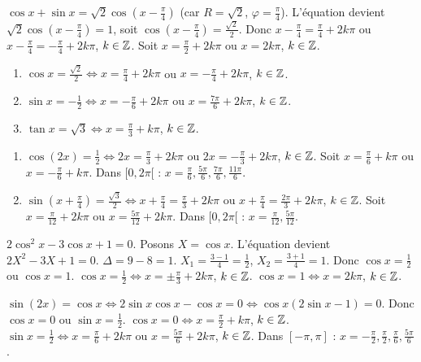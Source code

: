 $\cos x + \sin x = \sqrt2\cos\left(x-\frac{\pi}{4}\right)$ (car $R=\sqrt2$, $\varphi=\frac{\pi}{4}$).
L'équation devient $\sqrt2\cos\left(x-\frac{\pi}{4}\right) = 1$, soit $\cos\left(x-\frac{\pi}{4}\right) = \frac{\sqrt2}{2}$.
Donc $x-\frac{\pi}{4} = \frac{\pi}{4} + 2k\pi$ ou $x-\frac{\pi}{4} = -\frac{\pi}{4} + 2k\pi$, $k\in\mathbb{Z}$.
Soit $x = \frac{\pi}{2} + 2k\pi$ ou $x = 2k\pi$, $k\in\mathbb{Z}$.

\begin{enumerate}[label=\alph*)]
    \item $\cos x = \frac{\sqrt2}{2} \iff x = \frac{\pi}{4} + 2k\pi$ ou $x = -\frac{\pi}{4} + 2k\pi$, $k\in\mathbb{Z}$.
    \item $\sin x = -\frac12 \iff x = -\frac{\pi}{6} + 2k\pi$ ou $x = \frac{7\pi}{6} + 2k\pi$, $k\in\mathbb{Z}$.
    \item $\tan x = \sqrt3 \iff x = \frac{\pi}{3} + k\pi$, $k\in\mathbb{Z}$.
\end{enumerate}

\begin{enumerate}[label=\alph*)]
    \item $\cos(2x) = \frac12 \iff 2x = \frac{\pi}{3} + 2k\pi$ ou $2x = -\frac{\pi}{3} + 2k\pi$, $k\in\mathbb{Z}$.
    Soit $x = \frac{\pi}{6} + k\pi$ ou $x = -\frac{\pi}{6} + k\pi$.
    Dans $[0,2\pi[$ : $x = \frac{\pi}{6}, \frac{5\pi}{6}, \frac{7\pi}{6}, \frac{11\pi}{6}$.
    \item $\sin\left(x+\frac{\pi}{4}\right) = \frac{\sqrt3}{2} \iff x+\frac{\pi}{4} = \frac{\pi}{3} + 2k\pi$ ou $x+\frac{\pi}{4} = \frac{2\pi}{3} + 2k\pi$, $k\in\mathbb{Z}$.
    Soit $x = \frac{\pi}{12} + 2k\pi$ ou $x = \frac{5\pi}{12} + 2k\pi$.
    Dans $[0,2\pi[$ : $x = \frac{\pi}{12}, \frac{5\pi}{12}$.
\end{enumerate}

$2\cos^2 x - 3\cos x + 1 = 0$. Posons $X = \cos x$. L'équation devient $2X^2 - 3X + 1 = 0$.
$\Delta = 9 - 8 = 1$. $X_1 = \frac{3-1}{4} = \frac12$, $X_2 = \frac{3+1}{4} = 1$.
Donc $\cos x = \frac12$ ou $\cos x = 1$.
$\cos x = \frac12 \iff x = \pm\frac{\pi}{3} + 2k\pi$, $k\in\mathbb{Z}$.
$\cos x = 1 \iff x = 2k\pi$, $k\in\mathbb{Z}$.

$\sin(2x) = \cos x \iff 2\sin x\cos x - \cos x = 0 \iff \cos x(2\sin x - 1) = 0$.
Donc $\cos x = 0$ ou $\sin x = \frac12$.
$\cos x = 0 \iff x = \frac{\pi}{2} + k\pi$, $k\in\mathbb{Z}$.
$\sin x = \frac12 \iff x = \frac{\pi}{6} + 2k\pi$ ou $x = \frac{5\pi}{6} + 2k\pi$, $k\in\mathbb{Z}$.
Dans $[-\pi,\pi]$ : $x = -\frac{\pi}{2}, \frac{\pi}{2}, \frac{\pi}{6}, \frac{5\pi}{6}$.


